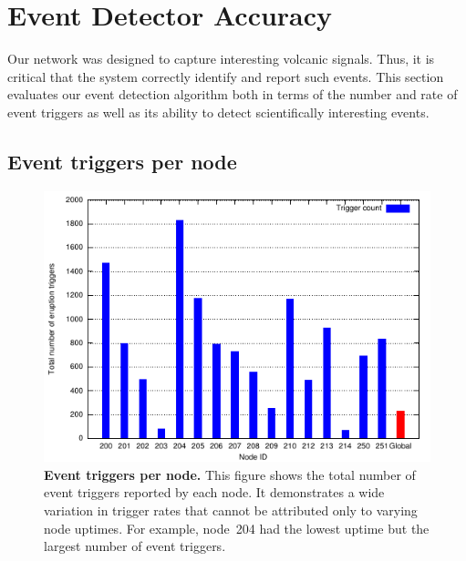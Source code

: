 \section{Event Detector Accuracy}
\label{evaluation-sec-eventdetection}

Our network was designed to capture interesting volcanic signals.  Thus, it
is critical that the system correctly identify and report such events.  This
section evaluates our event detection algorithm both in terms of the number
and rate of event triggers as well as its ability to detect scientifically
interesting events.

\subsection{Event triggers per node}

\begin{figure}[t]
\label{evaluation-fig-eventspernode}
\begin{center}
\includegraphics[width=\hsize]{./5-evaluation/figs/eventdetection/eruptionTriggers/eruptCount.pdf}
\end{center}
\caption{\textbf{Event triggers per node.}
This figure shows the total number of event triggers reported by each node.
It demonstrates a wide variation in trigger rates that cannot be attributed
only to varying node uptimes. For example, node~204 had the lowest uptime but
the largest number of event triggers.}
\end{figure}

